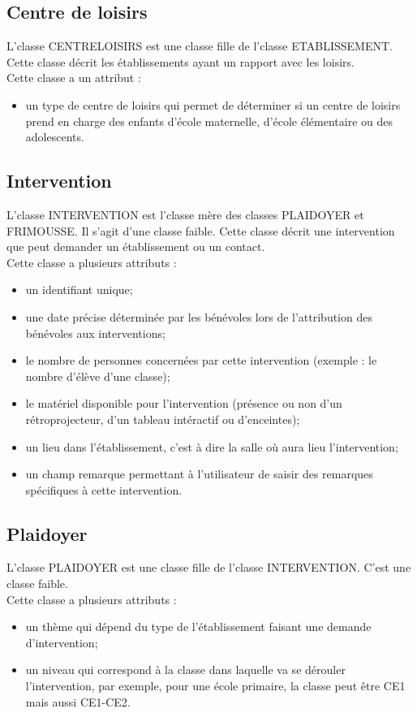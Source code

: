 \documentclass[asi, sansVersion]{picInsa}
\begin{document}
\subsection*{Centre de loisirs}
L'classe CENTRELOISIRS est une classe fille de l'classe ETABLISSEMENT. Cette classe décrit les établissements ayant un rapport avec les loisirs. \\
Cette classe a un attribut : 
\begin{itemize}
\item un type de centre de loisirs qui permet de déterminer si un centre de loisirs prend en charge des enfants d'école maternelle, d'école élémentaire ou des adolescents.
\end{itemize}  

\subsection*{Intervention}
L'classe INTERVENTION est l'classe mère des classes PLAIDOYER et FRIMOUSSE. Il s'agit d'une classe faible. Cette classe décrit une intervention que peut demander un établissement ou un contact. \\
Cette classe a plusieurs attributs :
\begin{itemize}
\item un identifiant unique;
\item une date précise déterminée par les bénévoles lors de l'attribution des bénévoles aux interventions;
\item le nombre de personnes concernées par cette intervention (exemple : le nombre d'élève d'une classe);
\item le matériel disponible pour l'intervention (présence ou non d'un rétroprojecteur, d'un tableau intéractif ou d'enceintes);
\item un lieu dans l'établissement, c'est à dire la salle où aura lieu l'intervention;
\item un champ remarque permettant à l'utilisateur de saisir des remarques spécifiques à cette intervention. 
\end{itemize}

\subsection*{Plaidoyer}
L'classe PLAIDOYER est une classe fille de l'classe INTERVENTION. C'est une classe faible. \\
Cette classe a plusieurs attributs : 
\begin{itemize}
\item un thème qui dépend du type de l'établissement faisant une demande d'intervention;
\item un niveau qui correspond à la classe dans laquelle va se dérouler l'intervention, par exemple, pour une école primaire, la classe peut être CE1 mais aussi CE1-CE2.
\end{itemize}
\end{document}
